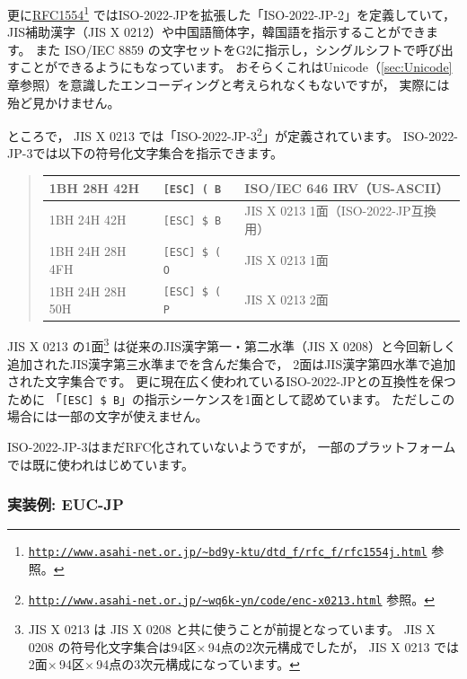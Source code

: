\documentclass[a4j,10pt,fleqn,uplatex]{jsarticle}
\begin{document}
更に\href{ftp://ftp.isi.edu/in-notes/rfc1554.txt}{RFC1554}\footnote{
    \href{http://www.asahi-net.or.jp/~bd9y-ktu/dtd_f/rfc_f/rfc1554j.html}{\texttt{http://www.asahi-net.or.jp/\~{}bd9y-ktu/dtd\_f/rfc\_f/rfc1554j.html}} 参照。
} ではISO-2022-JPを拡張した「ISO-2022-JP-2」を定義していて，
JIS補助漢字（JIS X 0212）や中国語簡体字，韓国語を指示することができます。
また ISO/IEC 8859 の文字セットをG2に指示し，シングルシフトで呼び出すことができるようにもなっています。
おそらくこれはUnicode（\ref{sec:Unicode}章参照）を意識したエンコーディングと考えられなくもないですが，
実際には殆ど見かけません。

ところで，
JIS X 0213 では「ISO-2022-JP-3\footnote{
    \href{http://www.asahi-net.or.jp/~wq6k-yn/code/enc-x0213.html}{\texttt{http://www.asahi-net.or.jp/\~{}wq6k-yn/code/enc-x0213.html}} 参照。
}」が定義されています。
ISO-2022-JP-3では以下の符号化文字集合を指示できます。
\begin{quote}\begin{tabular}{|l|l||l|}
    \hline
    1BH 28H 42H     & \texttt{[ESC] ( B}    & ISO/IEC 646 IRV（US-ASCII） \\ \hline
    1BH 24H 42H     & \texttt{[ESC] \$ B}   & JIS X 0213 1面（ISO-2022-JP互換用） \\ \hline
    1BH 24H 28H 4FH & \texttt{[ESC] \$ ( O} & JIS X 0213 1面 \\ \hline
    1BH 24H 28H 50H & \texttt{[ESC] \$ ( P} & JIS X 0213 2面 \\ \hline
\end{tabular}\end{quote}
JIS X 0213 の1面\footnote{
    JIS X 0213 は JIS X 0208 と共に使うことが前提となっています。
    JIS X 0208 の符号化文字集合は94区$\times$\,94点の2次元構成でしたが，
    JIS X 0213 では2面$\times$\,94区$\times$\,94点の3次元構成になっています。
} は従来のJIS漢字第一・第二水準（JIS X 0208）と今回新しく追加されたJIS漢字第三水準までを含んだ集合で，
2面はJIS漢字第四水準で追加された文字集合です。
更に現在広く使われているISO-2022-JPとの互換性を保つために
「\texttt{[ESC] \$ B}」の指示シーケンスを1面として認めています。
ただしこの場合には一部の文字が使えません。

ISO-2022-JP-3はまだRFC化されていないようですが，
一部のプラットフォームでは既に使われはじめています。

\subsubsection{実装例: EUC-JP} \label{sec:euc-jp}
\end{document}
